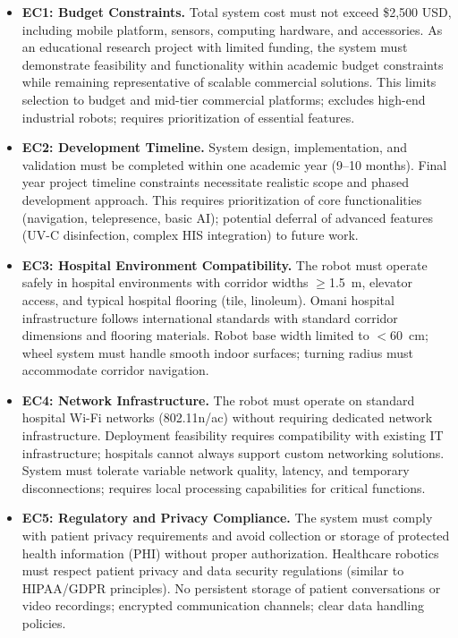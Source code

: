 \begin{itemize}
    \item \textbf{EC1: Budget Constraints.} Total system cost must not exceed \$2,500 USD, including mobile platform, sensors, computing hardware, and accessories. As an educational research project with limited funding, the system must demonstrate feasibility and functionality within academic budget constraints while remaining representative of scalable commercial solutions. This limits selection to budget and mid-tier commercial platforms; excludes high-end industrial robots; requires prioritization of essential features.
    
    \item \textbf{EC2: Development Timeline.} System design, implementation, and validation must be completed within one academic year (9--10 months). Final year project timeline constraints necessitate realistic scope and phased development approach. This requires prioritization of core functionalities (navigation, telepresence, basic AI); potential deferral of advanced features (UV-C disinfection, complex HIS integration) to future work.
    
    \item \textbf{EC3: Hospital Environment Compatibility.} The robot must operate safely in hospital environments with corridor widths $\geq$1.5~m, elevator access, and typical hospital flooring (tile, linoleum). Omani hospital infrastructure follows international standards with standard corridor dimensions and flooring materials. Robot base width limited to $<$60~cm; wheel system must handle smooth indoor surfaces; turning radius must accommodate corridor navigation.
    
    \item \textbf{EC4: Network Infrastructure.} The robot must operate on standard hospital Wi-Fi networks (802.11n/ac) without requiring dedicated network infrastructure. Deployment feasibility requires compatibility with existing IT infrastructure; hospitals cannot always support custom networking solutions. System must tolerate variable network quality, latency, and temporary disconnections; requires local processing capabilities for critical functions.
    
    \item \textbf{EC5: Regulatory and Privacy Compliance.} The system must comply with patient privacy requirements and avoid collection or storage of protected health information (PHI) without proper authorization. Healthcare robotics must respect patient privacy and data security regulations (similar to HIPAA/GDPR principles). No persistent storage of patient conversations or video recordings; encrypted communication channels; clear data handling policies.
    

\end{itemize}
